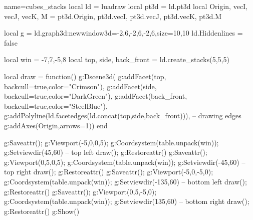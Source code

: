 \documentclass[border=5pt]{standalone}%
\begin{document}
\begin{luadraw}{name=cubes_stacks}
local ld = luadraw
local pt3d = ld.pt3d
local Origin, vecI, vecJ, vecK, M = pt3d.Origin, pt3d.vecI, pt3d.vecJ, pt3d.vecK, pt3d.M

local g = ld.graph3d:new{window3d={-2,6,-2,6,-2,6},size={10,10}}
ld.Hiddenlines = false

local win = {-7,7,-5,8}
local top, side, back_front = ld.create_stacks(5,5,5)

local draw = function()
    g:Dscene3d(
        g:addFacet(top, {backcull=true,color="Crimson"}), 
        g:addFacet(side, {backcull=true,color="DarkGreen"}),
        g:addFacet(back_front, {backcull=true,color="SteelBlue"}),
        g:addPolyline(ld.facetedges(ld.concat(top,side,back_front))), -- drawing edges
        g:addAxes(Origin,{arrows=1}))
end

g:Saveattr(); g:Viewport(-5,0,0,5); g:Coordsystem(table.unpack(win)); g:Setviewdir(45,60) -- top left
draw(); g:Restoreattr()
g:Saveattr(); g:Viewport(0,5,0,5); g:Coordsystem(table.unpack(win)); g:Setviewdir(-45,60) -- top right
draw(); g:Restoreattr()
g:Saveattr(); g:Viewport(-5,0,-5,0); g:Coordsystem(table.unpack(win)); g:Setviewdir(-135,60) -- bottom left
draw(); g:Restoreattr()
g:Saveattr(); g:Viewport(0,5,-5,0); g:Coordsystem(table.unpack(win)); g:Setviewdir(135,60) -- bottom right
draw(); g:Restoreattr()
g:Show()
\end{luadraw}
\end{document}
